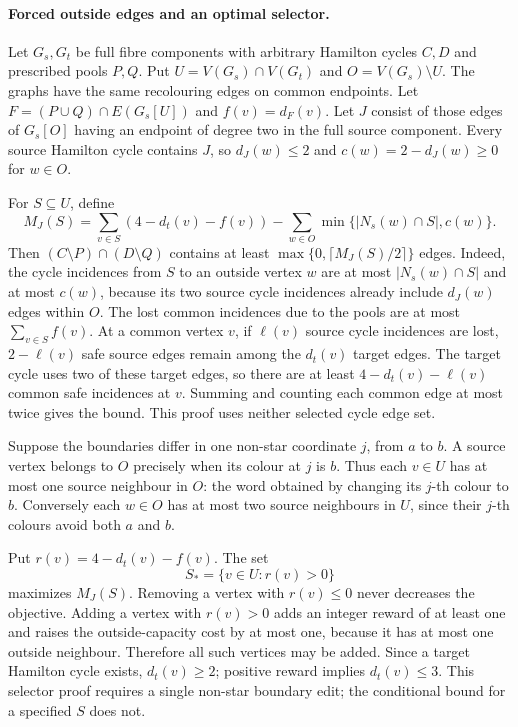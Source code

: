 \paragraph{Forced outside edges and an optimal selector.}
Let $G_s,G_t$ be full fibre components with arbitrary Hamilton cycles
$C,D$ and prescribed pools $P,Q$. Put
$U=V(G_s)\cap V(G_t)$ and $O=V(G_s)\setminus U$.
The graphs have the same recolouring edges on common endpoints.
Let $F=(P\cup Q)\cap E(G_s[U])$ and $f(v)=d_F(v)$.
Let $J$ consist of those edges of $G_s[O]$ having an endpoint of
degree two in the full source component. Every source Hamilton cycle
contains $J$, so $d_J(w)\le2$ and
$c(w)=2-d_J(w)\ge0$ for $w\in O$.

For $S\subseteq U$, define
\[
 M_J(S)=\sum_{v\in S}(4-d_t(v)-f(v))
       -\sum_{w\in O}\min\{|N_s(w)\cap S|,c(w)\}.
\]
Then $(C\setminus P)\cap(D\setminus Q)$ contains at least
$\max\{0,\lceil M_J(S)/2\rceil\}$ edges.
Indeed, the cycle incidences from $S$ to an outside vertex $w$ are
at most $|N_s(w)\cap S|$ and at most $c(w)$, because its two source
cycle incidences already include $d_J(w)$ edges within $O$.
The lost common incidences due to the pools are at most
$\sum_{v\in S}f(v)$. At a common vertex $v$, if $\ell(v)$ source
cycle incidences are lost, $2-\ell(v)$ safe source edges remain among
the $d_t(v)$ target edges. The target cycle uses two of these target
edges, so there are at least $4-d_t(v)-\ell(v)$ common safe
incidences at $v$. Summing and counting each common edge at most twice
gives the bound. This proof uses neither selected cycle edge set.

Suppose the boundaries differ in one non-star coordinate $j$, from
$a$ to $b$. A source vertex belongs to $O$ precisely when its colour
at $j$ is $b$. Thus each $v\in U$ has at most one source neighbour
in $O$: the word obtained by changing its $j$-th colour to $b$.
Conversely each $w\in O$ has at most two source neighbours in $U$,
since their $j$-th colours avoid both $a$ and $b$.

Put $r(v)=4-d_t(v)-f(v)$. The set
\[
 S_* = \{v\in U:r(v)>0\}
\]
maximizes $M_J(S)$. Removing a vertex with $r(v)\le0$ never
decreases the objective. Adding a vertex with $r(v)>0$ adds an
integer reward of at least one and raises the outside-capacity cost
by at most one, because it has at most one outside neighbour.
Therefore all such vertices may be added. Since a target Hamilton
cycle exists, $d_t(v)\ge2$; positive reward implies $d_t(v)\le3$.
This selector proof requires a single non-star boundary edit;
the conditional bound for a specified $S$ does not.

